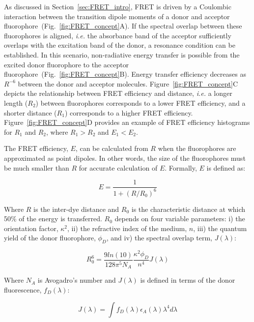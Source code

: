 As discussed in Section~\ref{sec:FRET_intro}, FRET is driven by a Coulombic interaction between the transition dipole moments of a donor and acceptor fluorophore~(Fig.~\ref{fig:FRET_concept}A).
If the spectral overlap between these fluorophores is aligned, \textit{i.e.} the absorbance band of the acceptor sufficiently overlaps with the excitation band of the donor, a resonance condition can be established. 
In this scenario, non-radiative energy transfer is possible from the excited donor fluorophore to the acceptor fluorophore~(Fig.~\ref{fig:FRET_concept}B). 
Energy transfer efficiency decreases as $R^{-6}$ between the donor and acceptor molecules. 
Figure~\ref{fig:FRET_concept}C depicts the relationship between FRET efficiency and distance, \textit{i.e.} a longer length ($R_2$) between fluorophores corresponds to a lower FRET efficiency, and a shorter distance ($R_1$) corresponds to a higher FRET efficiency.
Figure~\ref{fig:FRET_concept}D provides an example of FRET efficiency histograms for $R_1$ and $R_2$, where $R_1 > R_2$ and $E_1 < E_2$.

The FRET efficiency, $E$, can be calculated from $R$ when the fluorophores are approximated as point dipoles.
In other words, the size of the fluorophores must be much smaller than $R$ for accurate calculation of $E$. Formally, $E$ is defined as:

\begin{equation}
\label{eqn:E}
E=\frac{1}{1+(R/R_0)^6}
\end{equation}

\noindent
Where $R$ is the inter-dye distance and $R_0$ is the characteristic distance at which 50\% of the energy is transferred.
$R_0$ depends on four variable parameters: i) the orientation factor, $\kappa^2$, ii) the refractive index of the medium, $n$, iii) the quantum yield of the donor fluorophore, $\phi_D$, and iv) the spectral overlap term, $J(\lambda)$:

\begin{equation}
\label{eqn:R_0^6}
R_0^6 = \frac{9ln(10)}{128\pi^5 N_A} \frac{\kappa^2 \phi_D}{n^4}J(\lambda)
\end{equation}

\noindent
Where $N_A$ is Avogadro's number and $J(\lambda)$ is defined in terms of the donor fluorescence, $f_D(\lambda)$:

\begin{equation}
\label{eqn:J}
J(\lambda) = \int f_D(\lambda)\epsilon_A(\lambda)\lambda^4 d\lambda
\end{equation}

